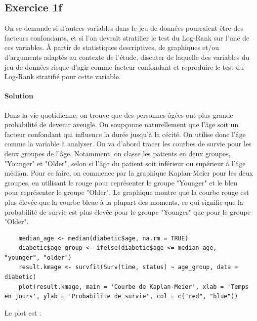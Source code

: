 \documentclass[../main.tex]{subfiles}
\begin{document}
\begin{CJK*}{UTF8}{gbsn}

\section*{Exercice 1f}
On se demande si d'autres variables
dans le jeu de données pourraient être des facteurs confondants, et si l'on devrait stratifier le
test du Log-Rank sur l'une de ces variables. À partir de statistiques descriptives, de graphiques
et/ou d'arguments adaptés au contexte de l'étude, discuter de laquelle des variables du jeu de
données risque d'agir comme facteur confondant et reproduire le test du Log-Rank stratifié pour cette variable.
    
\paragraph{Solution}
Dans la vie quotidienne, on trouve que des personnes 
âgées ont plus grande probabilité de devenir aveugle. 
On soupçonne naturellement que l'âge
soit un facteur confondant qui influence la durée jusqu'à la cécité.
On utilise donc l'âge comme la variable à analyser. 
On va d'abord tracer les courbes de survie pour les deux groupes de l'âge.
Notamment, on classe les patients en deux groupes, "Younger" et "Older",
selon si l'âge du patient soit inférieur ou supérieur à l'âge médian.
Pour ce faire, on commence par la graphique Kaplan-Meier pour les deux groupes,
en utilisant le rouge pour représenter le groupe "Younger" 
et le bleu pour représenter le groupe "Older". 
Le graphique montre que la courbe rouge est plus élevée que la courbe bleue 
à la plupart des moments, ce qui signifie que la probabilité de survie est plus 
élevée pour le groupe "Younger" que pour le groupe "Older". 

\begin{lstlisting}
    median_age <- median(diabetic$age, na.rm = TRUE)
    diabetic$age_group <- ifelse(diabetic$age <= median_age, "younger", "older")
    result.kmage <- survfit(Surv(time, status) ~ age_group, data = diabetic)
    plot(result.kmage, main = 'Courbe de Kaplan-Meier', xlab = 'Temps en jours', ylab = 'Probabilite de survie', col = c("red", "blue"))
\end{lstlisting}

Le plot est :


\end{CJK*}
\end{document}
